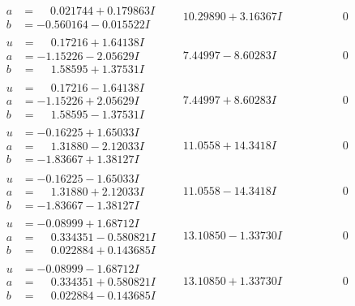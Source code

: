 \documentclass[1p]{elsarticle_modified}
\theoremstyle{definition}
\begin{document}
$$\begin{array}{c|c|c}
\begin{aligned}
a &= \phantom{-}0.021744 + 0.179863 I \\
b &= -0.560164 - 0.015522 I\end{aligned}
 & \phantom{-}10.29890 + 3.16367 I & \phantom{-0.000000 } 0 \\ \hline\begin{aligned}
u &= \phantom{-}0.17216 + 1.64138 I \\
a &= -1.15226 - 2.05629 I \\
b &= \phantom{-}1.58595 + 1.37531 I\end{aligned}
 & \phantom{-}7.44997 - 8.60283 I & \phantom{-0.000000 } 0 \\ \hline\begin{aligned}
u &= \phantom{-}0.17216 - 1.64138 I \\
a &= -1.15226 + 2.05629 I \\
b &= \phantom{-}1.58595 - 1.37531 I\end{aligned}
 & \phantom{-}7.44997 + 8.60283 I & \phantom{-0.000000 } 0 \\ \hline\begin{aligned}
u &= -0.16225 + 1.65033 I \\
a &= \phantom{-}1.31880 - 2.12033 I \\
b &= -1.83667 + 1.38127 I\end{aligned}
 & \phantom{-}11.0558 + 14.3418 I & \phantom{-0.000000 } 0 \\ \hline\begin{aligned}
u &= -0.16225 - 1.65033 I \\
a &= \phantom{-}1.31880 + 2.12033 I \\
b &= -1.83667 - 1.38127 I\end{aligned}
 & \phantom{-}11.0558 - 14.3418 I & \phantom{-0.000000 } 0 \\ \hline\begin{aligned}
u &= -0.08999 + 1.68712 I \\
a &= \phantom{-}0.334351 - 0.580821 I \\
b &= \phantom{-}0.022884 + 0.143685 I\end{aligned}
 & \phantom{-}13.10850 - 1.33730 I & \phantom{-0.000000 } 0 \\ \hline\begin{aligned}
u &= -0.08999 - 1.68712 I \\
a &= \phantom{-}0.334351 + 0.580821 I \\
b &= \phantom{-}0.022884 - 0.143685 I\end{aligned}
 & \phantom{-}13.10850 + 1.33730 I & \phantom{-0.000000 } 0\\

\end{array}$$
\end{document}
